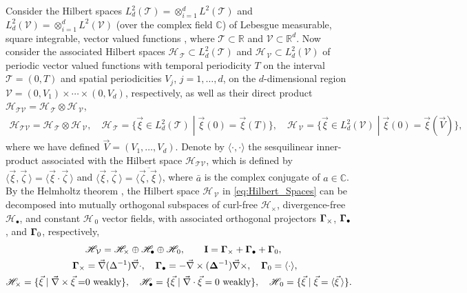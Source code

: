 \documentclass[11pt]{amsart}
\newcommand{\Ib}{\mathbf{I}}
\newcommand{\Tc}{\mathcal{T}}
\newcommand{\Vc}{\mathcal{V}}
\newcommand{\Hs}{\mathscr{H}}
\newcommand\bDelta{\mbox{\boldmath${\Delta}$}}
\newcommand\bGamma{\mbox{\boldmath${\Gamma}$}}
\begin{document}
Consider the Hilbert spaces $L^2_d(\Tc)=\otimes_{i=1}^dL^2(\Tc)$ and
$L^2_d(\Vc)=\otimes_{i=1}^dL^2(\Vc)$ (over the complex field $\mathbb{C}$)
of Lebesgue measurable, square integrable, vector valued functions
\cite{Folland:99}, where $\Tc\subset\mathbb{R}$ and $\Vc\subset\mathbb{R}^d$. Now 
consider the associated Hilbert spaces $\Hs_{\,\Tc}\subset L^2_d(\Tc)$ and
$\Hs_{\,\Vc}\subset L^2_d(\Vc)$ of periodic vector valued functions with
temporal periodicity $T$ on the interval $\Tc=(0,T)$ and spatial
periodicities $V_j$, $j=1,\ldots,d$, on the $d$-dimensional region
$\Vc=(0,V_1)\times\cdots\times(0,V_d)$, respectively, as well as their direct product 
$\Hs_{\Tc\Vc}=\Hs_{\,\Tc}\otimes\Hs_{\,\Vc}$,
%
\begin{align}\label{eq:Hilbert_Spaces}
  \Hs_{\Tc\Vc}=\Hs_{\,\Tc}\otimes\Hs_{\,\Vc}, \quad
  \Hs_{\,\Tc}=\{ 
     \vec{\xi}\in L^2_d(\Tc)\;|\;
     \vec{\xi}(0)=\vec{\xi}(T) 
                        \}, \quad
  \Hs_{\,\Vc}=\{ 
     \vec{\xi}\in L^2_d(\Vc)\;|\;
     \vec{\xi}(0)=\vec{\xi}(\vec{V}) 
                        \}, 
\end{align}
%
where we have defined $\vec{V}=(V_1,\ldots,V_d)$. Denote by $\langle\cdot,\cdot\rangle$ the
sesquilinear inner-product associated with the Hilbert space
$\Hs_{\Tc\Vc}$, which is defined by
$\langle\vec{\xi},\vec{\zeta}\,\rangle=\langle\vec{\xi}\cdot\vec{\zeta}\,\rangle$  and
$\langle\vec{\xi},\vec{\zeta}\,\rangle=\overline{\langle\vec{\zeta},\vec{\xi}\,\rangle}$, where $\bar{a}$ 
is the complex conjugate of $a\in\mathbb{C}$. By the Helmholtz theorem 
\cite{Denaro:2003:0271,Bhatia:IEE:1077}, the 
Hilbert space $\Hs_{\,\Vc}$ in \eqref{eq:Hilbert_Spaces} can be
decomposed into mutually orthogonal subspaces of curl-free $\Hs_\times$,
divergence-free $\Hs_\bullet$, and constant $\Hs_{\,0}$ vector fields, with
associated orthogonal projectors $\bGamma_\times$, $\bGamma_\bullet$, and
$\bGamma_0$, respectively,
\cite{Fannjiang:SIAM_JAM:333,MILTON:2002:TC}    
%
\begin{align}\label{eq:Helmholtz}
  &\Hs_{\,\Vc}=\Hs_\times\oplus\Hs_\bullet\oplus\Hs_{\,0},\qquad
  \Ib=\bGamma_\times+\bGamma_\bullet+\bGamma_0, \\
  \bGamma_\times&=\vec{\nabla}(\Delta^{-1})\vec{\nabla}\cdot, \quad
  \bGamma_\bullet=-\vec{\nabla}\times(\bDelta^{-1})\vec{\nabla}\times, \quad
  \bGamma_0=\langle\cdot\rangle, \quad
  \notag \\
  \Hs_\times=\{\vec{\xi}\;|\;\vec{\nabla}\times\vec{\xi}=&0 \text{ weakly}\}, \quad
  \Hs_\bullet
      =\{\vec{\xi}\;|\;\vec{\nabla}\cdot\vec{\xi}=0 \text{ weakly}\},   \quad
  \Hs_{\,0}
      =\{\vec{\xi}\;|\;\vec{\xi}=\langle\vec{\xi}\,\rangle\}.
     \notag  
\end{align}
%
\end{document}
